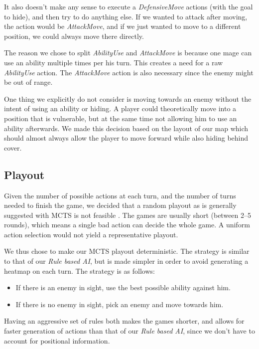 It also doesn't make any sense to execute a \emph{DefensiveMove} actions (with
the goal to hide), and then try to do anything else. If we wanted to attack
after moving, the action would be \emph{AttackMove}, and if we just wanted to
move to a different position, we could always move there directly.

The reason we chose to split \emph{AbilityUse} and \emph{AttackMove} is because one
mage can use an ability multiple times per his turn. This creates a need for a raw
\emph{AbilityUse} action. The \emph{AttackMove} action is also necessary since the enemy
might be out of range.

One thing we explicitly do not consider is moving towards an enemy without the intent
of using an ability or hiding. A player could theoretically move into a position
that is vulnerable, but at the same time not allowing him to use an ability afterwards.
We made this decision based on the layout of our map which should
almost always allow the player to move forward while also hiding behind cover.

\subsection{Playout}

Given the number of possible actions at each turn, and the number of turns
needed to finish the game, we decided that a random playout as is generally
suggested with MCTS is not feasible \citep{mcts-survey}. The games
are usually short (between 2--5 rounds), which means a single bad action can decide
the whole game. A uniform action selection would not yield a representative playout.

We thus chose to make our MCTS playout deterministic. The strategy
is similar to that of our \emph{Rule based AI}, but is made simpler in order
to avoid generating a heatmap on each turn. The strategy is as follows:

\begin{itemize}
\item If there is an enemy in sight, use the best possible ability against him.
\item If there is no enemy in sight, pick an enemy and move towards him.
\end{itemize}

Having an aggressive set of rules both makes the games shorter, and allows for faster generation of actions than that of our \emph{Rule based AI}, since we don't have to account for positional information.

